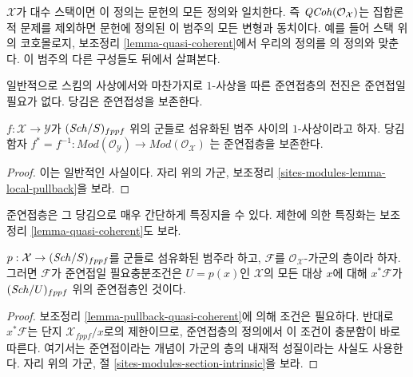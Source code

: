 \noindent
$\mathcal{X}$가 대수 스택이면 이 정의는 문헌의 모든 정의와 일치한다.
즉 $\mathit{QCoh}(\mathcal{O}_\mathcal{X})$는 집합론적 문제를 제외하면
문헌에 정의된 이 범주의 모든 변형과 동치이다. 예를 들어 스택 위의
코호몰로지, 보조정리 \ref{lemma-quasi-coherent}에서 우리의 정의를
\cite[정의 6.1]{olsson_sheaves}의 정의와 맞춘다.
이 범주의 다른 구성들도 뒤에서 살펴본다.

\medskip\noindent
일반적으로 스킴의 사상에서와 마찬가지로 $1$-사상을 따른
준연접층의 전진은 준연접일 필요가 없다. 당김은 준연접성을 보존한다.

\begin{lemma}
\label{lemma-pullback-quasi-coherent}
$f : \mathcal{X} \to \mathcal{Y}$가 $(\mathit{Sch}/S)_{fppf}$ 위의 군들로
섬유화된 범주 사이의 $1$-사상이라고 하자. 당김 함자
$f^* = f^{-1} : \textit{Mod}(\mathcal{O}_\mathcal{Y}) \to
\textit{Mod}(\mathcal{O}_\mathcal{X})$
는 준연접층을 보존한다.
\end{lemma}

\begin{proof}
이는 일반적인 사실이다. 자리 위의 가군, 보조정리
\ref{sites-modules-lemma-local-pullback}을 보라.
\end{proof}

\noindent
준연접층은 그 당김으로 매우 간단하게 특징지을 수 있다.
제한에 의한 특징화는 보조정리 \ref{lemma-quasi-coherent}도 보라.

\begin{lemma}
\label{lemma-characterize-quasi-coherent}
$p : \mathcal{X} \to (\mathit{Sch}/S)_{fppf}$를 군들로 섬유화된 범주라 하고,
$\mathcal{F}$를 $\mathcal{O}_\mathcal{X}$-가군의 층이라 하자.
그러면 $\mathcal{F}$가 준연접일 필요충분조건은 $U = p(x)$인
$\mathcal{X}$의 모든 대상 $x$에 대해 $x^*\mathcal{F}$가
$(\mathit{Sch}/U)_{fppf}$ 위의 준연접층인 것이다.
\end{lemma}

\begin{proof}
보조정리 \ref{lemma-pullback-quasi-coherent}에 의해 조건은 필요하다.
반대로 $x^*\mathcal{F}$는 단지 $\mathcal{X}_{fppf}/x$로의 제한이므로,
준연접층의 정의에서 이 조건이 충분함이 바로 따른다. 여기서는
준연접이라는 개념이 가군의 층의 내재적 성질이라는 사실도 사용한다.
자리 위의 가군, 절 \ref{sites-modules-section-intrinsic}을 보라.
\end{proof}

